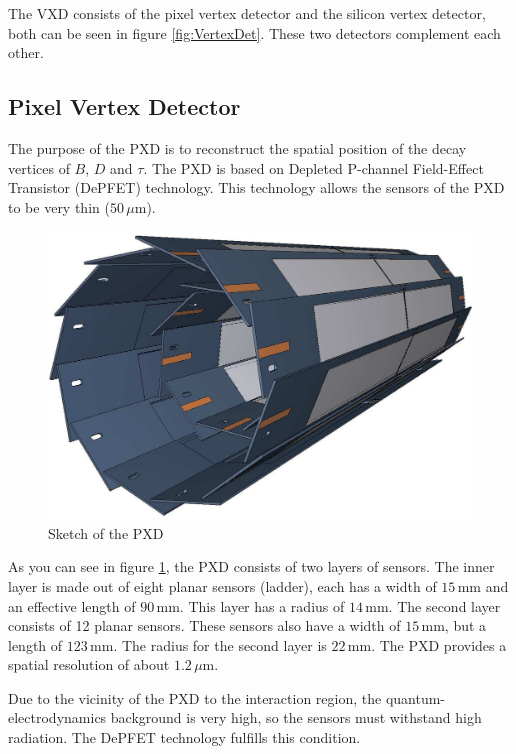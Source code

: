 \documentclass[a4paper,11pt,twosided,final,german,openbib,pdftex,listof=totoc,bibliography=totoc]{scrbook}
\begin{document}
The VXD consists of the pixel vertex detector and the silicon vertex detector, both can be seen in figure \ref{fig:VertexDet}. These two detectors complement each other.


\subsection{Pixel Vertex Detector}
\label{sec:Pixel}
The purpose of the PXD is to reconstruct the spatial position of the decay vertices of $B$, $D$ and $\tau$.
The PXD is based on Depleted P-channel Field-Effect Transistor (DePFET) technology. This technology allows the sensors of the PXD to be very thin ($50\,\mu\textrm{m}$).

\begin{figure}[h!]
	\begin{center}
		\includegraphics[width=12cm]{Bilder/pixel}
	\end{center}
	\caption[Pixel Detector]{Sketch of the PXD \cite{B2TR}}
	\label{fig:pxd}
\end{figure}

As you can see in figure \ref{fig:pxd}, the PXD consists of two layers of sensors. The inner layer is made out of eight planar sensors (ladder), each has a width of $15\,\textrm{mm}$ and an effective length of $90\,\textrm{mm}$. This layer has a radius of $14\,\textrm{mm}$. The second layer consists of 12 planar sensors. These sensors also have a width of $15\,\textrm{mm}$, but a length of $123\,\textrm{mm}$. The radius for the second layer is $22\,\textrm{mm}$. The PXD provides a spatial resolution of about $1.2\,\mu\textrm{m}$.\cite{B2TR}

Due to the vicinity of the PXD to the interaction region, the quantum-electrodynamics background is very high, so the sensors  must withstand high radiation. The DePFET technology fulfills this condition. \cite{B2TR} \cite{MARINAS201159}
\newline 
\end{document}
